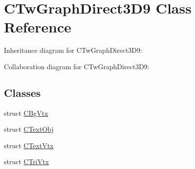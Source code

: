 \hypertarget{class_c_tw_graph_direct3_d9}{\section{C\+Tw\+Graph\+Direct3\+D9 Class Reference}
\label{class_c_tw_graph_direct3_d9}
}


Inheritance diagram for C\+Tw\+Graph\+Direct3\+D9\+:


Collaboration diagram for C\+Tw\+Graph\+Direct3\+D9\+:
\subsection*{Classes}
\begin{DoxyCompactItemize}
\item 
struct \hyperlink{struct_c_tw_graph_direct3_d9_1_1_c_bg_vtx}{C\+Bg\+Vtx}
\item 
struct \hyperlink{struct_c_tw_graph_direct3_d9_1_1_c_text_obj}{C\+Text\+Obj}
\item 
struct \hyperlink{struct_c_tw_graph_direct3_d9_1_1_c_text_vtx}{C\+Text\+Vtx}
\item 
struct \hyperlink{struct_c_tw_graph_direct3_d9_1_1_c_tri_vtx}{C\+Tri\+Vtx}
\end{DoxyCompactItemize}
